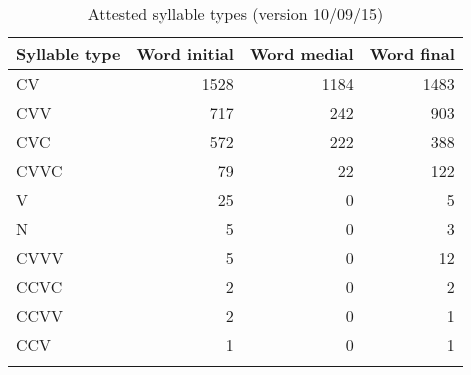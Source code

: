 \begin{table}[htb] \small
 \centering
\caption[Syllable Types]{Attested syllable types (version 10/09/15)
\label{tab:syll-type}}
\begin{tabular}{lrrr}
\lsptoprule
Syllable type & Word initial & Word medial & Word final \\[1ex]
\midrule
CV & 1528 & 1184 & 1483  \\ 
CVV & 717 & 242 & 903  \\ 
CVC & 572 & 222& 388  \\
CVVC & 79 & 22 & 122  \\ 
V & 25 & 0 & 5 \\ 
N & 5 & 0 & 3  \\ 
CVVV & 5&0&12 \\
CCVC & 2 & 0 & 2  \\
CCVV & 2 & 0 & 1 \\ 
CCV & 1 & 0 & 1 \\ 


 \lspbottomrule
\end{tabular}
\end{table} 



